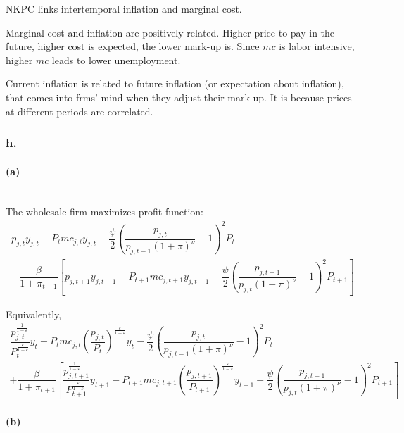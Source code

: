 \documentclass{article}
\begin{document}
NKPC links intertemporal inflation and marginal cost. 

Marginal cost and inflation are positively related. Higher price to pay in the future, higher cost is expected, the lower mark-up is. Since $mc$ is labor intensive, higher $mc$ leads to lower unemployment.

Current inflation is related to future inflation (or expectation about inflation), that comes into frms' mind when they adjust their mark-up. It is because prices at different periods are correlated.

\subsubsection*{h.}

\paragraph*{(a)}\mbox{}\\

The wholesale firm maximizes profit function:
\begin{multline*}
    p_{j,t}y_{j,t}-P_{t}mc_{j,t}y_{j,t}-\dfrac{\psi}{2}\left(\dfrac{p_{j,t}}{p_{j,t-1}\left(1+\pi\right)^{\nu}}-1\right)^{2}P_{t}\\
    +\dfrac{\beta}{1+\pi_{t+1}}\left[p_{j,t+1}y_{j,t+1}-P_{t+1}mc_{j,t+1}y_{j,t+1}-\dfrac{\psi}{2}\left(\dfrac{p_{j,t+1}}{p_{j,t}\left(1+\pi\right)^{\nu}}-1\right)^{2}P_{t+1}\right]
\end{multline*}

Equivalently,
\begin{multline*}
    \dfrac{p_{j,t}^{\frac{1}{1-\varepsilon}}}{P_{t}^{\frac{\varepsilon}{1-\varepsilon}}}y_{t}-P_{t}mc_{j,t}\left(\dfrac{p_{j,t}}{P_{t}}\right)^{\frac{\varepsilon}{1-\varepsilon}}y_{t}-\dfrac{\psi}{2}\left(\dfrac{p_{j,t}}{p_{j,t-1}\left(1+\pi\right)^{\nu}}-1\right)^{2}P_{t}\\
    +\dfrac{\beta}{1+\pi_{t+1}}\left[\dfrac{p_{j,t+1}^{\frac{1}{1-\varepsilon}}}{P_{t+1}^{\frac{\varepsilon}{1-\varepsilon}}}y_{t+1}-P_{t+1}mc_{j,t+1}\left(\dfrac{p_{j,t+1}}{P_{t+1}}\right)^{\frac{\varepsilon}{1-\varepsilon}}y_{t+1}-\dfrac{\psi}{2}\left(\dfrac{p_{j,t+1}}{p_{j,t}\left(1+\pi\right)^{\nu}}-1\right)^{2}P_{t+1}\right]
\end{multline*}

\paragraph*{(b)}\mbox{}\\
\end{document}
